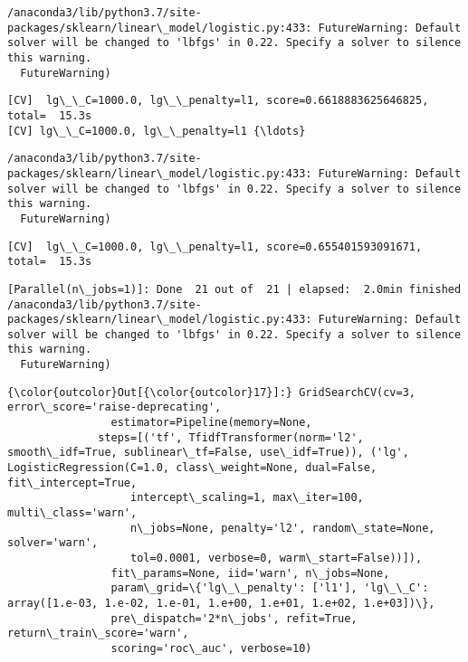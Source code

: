 \documentclass[11pt]{article}
\begin{document}
    \begin{Verbatim}[commandchars=\\\{\}]
/anaconda3/lib/python3.7/site-packages/sklearn/linear\_model/logistic.py:433: FutureWarning: Default solver will be changed to 'lbfgs' in 0.22. Specify a solver to silence this warning.
  FutureWarning)

    \end{Verbatim}

    \begin{Verbatim}[commandchars=\\\{\}]
[CV]  lg\_\_C=1000.0, lg\_\_penalty=l1, score=0.6618883625646825, total=  15.3s
[CV] lg\_\_C=1000.0, lg\_\_penalty=l1 {\ldots}

    \end{Verbatim}

    \begin{Verbatim}[commandchars=\\\{\}]
/anaconda3/lib/python3.7/site-packages/sklearn/linear\_model/logistic.py:433: FutureWarning: Default solver will be changed to 'lbfgs' in 0.22. Specify a solver to silence this warning.
  FutureWarning)

    \end{Verbatim}

    \begin{Verbatim}[commandchars=\\\{\}]
[CV]  lg\_\_C=1000.0, lg\_\_penalty=l1, score=0.655401593091671, total=  15.3s

    \end{Verbatim}

    \begin{Verbatim}[commandchars=\\\{\}]
[Parallel(n\_jobs=1)]: Done  21 out of  21 | elapsed:  2.0min finished
/anaconda3/lib/python3.7/site-packages/sklearn/linear\_model/logistic.py:433: FutureWarning: Default solver will be changed to 'lbfgs' in 0.22. Specify a solver to silence this warning.
  FutureWarning)

    \end{Verbatim}

\begin{Verbatim}[commandchars=\\\{\}]
{\color{outcolor}Out[{\color{outcolor}17}]:} GridSearchCV(cv=3, error\_score='raise-deprecating',
                estimator=Pipeline(memory=None,
              steps=[('tf', TfidfTransformer(norm='l2', smooth\_idf=True, sublinear\_tf=False, use\_idf=True)), ('lg', LogisticRegression(C=1.0, class\_weight=None, dual=False, fit\_intercept=True,
                   intercept\_scaling=1, max\_iter=100, multi\_class='warn',
                   n\_jobs=None, penalty='l2', random\_state=None, solver='warn',
                   tol=0.0001, verbose=0, warm\_start=False))]),
                fit\_params=None, iid='warn', n\_jobs=None,
                param\_grid=\{'lg\_\_penalty': ['l1'], 'lg\_\_C': array([1.e-03, 1.e-02, 1.e-01, 1.e+00, 1.e+01, 1.e+02, 1.e+03])\},
                pre\_dispatch='2*n\_jobs', refit=True, return\_train\_score='warn',
                scoring='roc\_auc', verbose=10)
\end{Verbatim}
            
\end{document}
